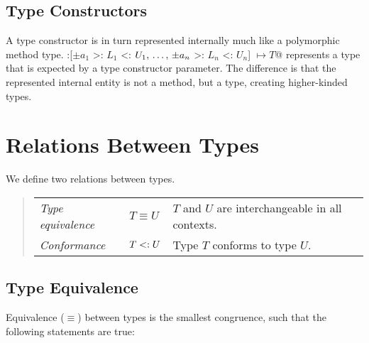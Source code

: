 \subsection{Type Constructors}
\label{sec:type-constructors}

A type constructor is in turn represented internally much like a polymorphic method type. \lstinline@:[$\pm a_1$ >: $L_1$ <: $U_1 ,\, \ldots ,\, \pm a_n$ >: $L_n$ <: $U_n$] $\mapsto T$@ represents a type that is expected by a type constructor parameter. The difference is that the represented internal entity is not a method, but a type, creating higher-kinded types. 

\section{Relations Between Types}

We define two relations between types. 
\begin{quote}\begin{tabular}{l@{\gap}l@{\gap}l}
\em Type equivalence & $T \equiv U$ & $T$ and $U$ are interchangeable
in all contexts.
\\
\em Conformance & $T <: U$ & Type $T$ conforms to type $U$.
\end{tabular}\end{quote}

\subsection{Type Equivalence}

Equivalence ($\equiv$) between types is the smallest congruence, such that the following statements are true:

